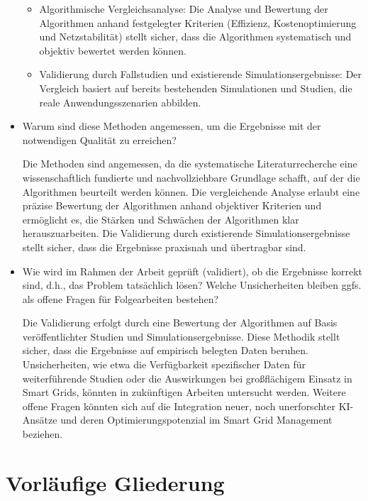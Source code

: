 \documentclass[12pt]{article} %
\begin{document}
\begin{itemize}
\begin{itemize}
        \item Algorithmische Vergleichsanalyse: Die Analyse und Bewertung der Algorithmen anhand festgelegter Kriterien (Effizienz, Kostenoptimierung und Netzstabilität) stellt sicher, dass die Algorithmen systematisch und objektiv bewertet werden können. 
        \item Validierung durch Fallstudien und existierende Simulationsergebnisse: Der Vergleich basiert auf bereits bestehenden Simulationen und Studien, die reale Anwendungsszenarien abbilden. 
    \end{itemize}

\item Warum sind diese Methoden angemessen, um die Ergebnisse mit der notwendigen Qualität zu erreichen?

    Die Methoden sind angemessen, da die systematische Literaturrecherche eine wissenschaftlich fundierte und nachvollziehbare Grundlage schafft, auf der die Algorithmen beurteilt werden können. Die vergleichende Analyse erlaubt eine präzise Bewertung der Algorithmen anhand objektiver Kriterien und ermöglicht es, die Stärken und Schwächen der Algorithmen klar herauszuarbeiten. Die Validierung durch existierende Simulationsergebnisse stellt sicher, dass die Ergebnisse praxisnah und übertragbar sind.

\item Wie wird im Rahmen der Arbeit geprüft (validiert), ob die Ergebnisse korrekt sind, d.h., das Problem tatsächlich lösen? Welche Unsicherheiten bleiben ggfs. als offene Fragen für Folgearbeiten bestehen?

    Die Validierung erfolgt durch eine Bewertung der Algorithmen auf Basis veröffentlichter Studien und Simulationsergebnisse. Diese Methodik stellt sicher, dass die Ergebnisse auf empirisch belegten Daten beruhen. Unsicherheiten, wie etwa die Verfügbarkeit spezifischer Daten für weiterführende Studien oder die Auswirkungen bei großflächigem Einsatz in Smart Grids, könnten in zukünftigen Arbeiten untersucht werden. Weitere offene Fragen könnten sich auf die Integration neuer, noch unerforschter KI-Ansätze und deren Optimierungspotenzial im Smart Grid Management beziehen.
    
\end{itemize}



\section{Vorläufige Gliederung}
\end{document}
